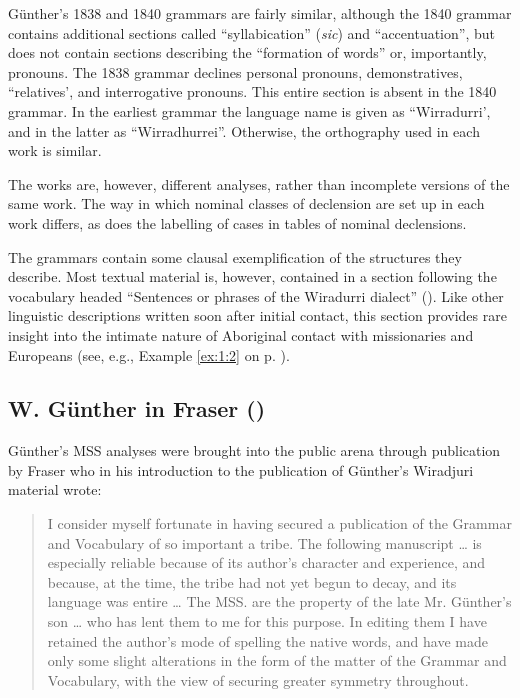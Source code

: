 Günther’s 1838 and 1840 grammars are fairly similar, although the 1840 grammar contains additional sections called “syllabication” (\textit{sic}) and “accentuation”, but does not contain sections describing the “formation of words” or, importantly, pronouns. The 1838 grammar declines personal pronouns, demonstratives, “relatives’, and interrogative pronouns. This entire section is absent in the 1840 grammar. In the earliest grammar the language name is given as “Wirradurri’, and in the latter as ``Wirradhurrei''. Otherwise, the orthography used in each work is similar.

The works are, however, different analyses, rather than incomplete versions of the same work. The way in which nominal classes of declension are set up in each work differs, as does the labelling of cases in tables of nominal declensions. 

The grammars contain some clausal exemplification of the structures they describe. Most textual material is, however, contained in a section following the vocabulary headed “Sentences or phrases of the Wiradurri dialect” (\citealt[249]{gunther_native_1838}). Like other linguistic descriptions written soon after initial contact, this section provides rare insight into the intimate nature of Aboriginal contact with missionaries and Europeans (see, e.g., Example \ref{ex:1:2} on p. \pageref{ex:1:2}).

\subsection{W. Günther in Fraser (\citeyear{gunther_grammar_1892})}
\label{sec:key:4.1.2}

Günther’s MSS analyses were brought into the public arena through publication by Fraser who in his introduction to the publication of Günther’s Wiradjuri material \citep{gunther_grammar_1892} wrote: 

\begin{quote}
    I consider myself fortunate in having secured a publication of the Grammar and Vocabulary of so important a tribe. The following manuscript … is especially reliable because of its author’s character and experience, and because, at the time, the tribe had not yet begun to decay, and its language was entire … The MSS. are the property of the late Mr. Günther’s son … who has lent them to me for this purpose. In editing them I have retained the author’s mode of spelling the native words, and have made only some slight alterations in the form of the matter of the Grammar and Vocabulary, with the view of securing greater symmetry throughout. \citep[56]{gunther_grammar_1892}
\end{quote}

